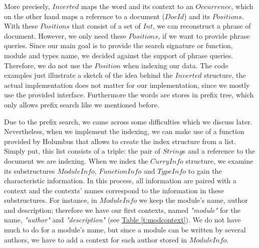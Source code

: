 \documentclass[%
	pdftex,%
	a4paper,%
	oneside,%
	chapterprefix,%
	headsepline,%
	12pt%
]{scrbook}
\newcommand{\textss}[1]{"#1"}
\newcommand{\Conid}[1]{\mathit{#1}}
\begin{document}
More precisely, \ensuremath{\Conid{Inverted}} maps the word and its context to an
\ensuremath{\Conid{Occurrence}}, which on the other hand maps a reference to a document
(\ensuremath{\Conid{DocId}}) and its \ensuremath{\Conid{Positions}}. %
With these \ensuremath{\Conid{Positions}} that consist of a set of \ensuremath{\Conid{Int}}, we can
reconstruct a phrase of document. %
However, we only need these \ensuremath{\Conid{Positions}}, if we want to provide phrase
queries. %
Since our main goal is to provide the search signature or function,
module and types name, we decided against the support of phrase
queries. %
Therefore, we do not use the \ensuremath{\Conid{Position}} when indexing our data. %
The code examples just illustrate a sketch of the idea behind the
\ensuremath{\Conid{Inverted}} structure, the actual implementation does not matter for
our implementation, since we mostly use the provided interface. %
Furthermore the words are stores in prefix tree, which only allows
prefix search like we mentioned before. %


Due to the prefix search, we came across some difficulties which we
discuss later. %
Nevertheless, when we implement the indexing, we can make use of a function
provided by Holumbus that allows to create the index structure from a
list. %
Simply put, this list consists of a triple: the pair of \ensuremath{\Conid{String}}s and
a reference to the document we are indexing. %
When we index the \ensuremath{\Conid{CurryInfo}} structure, we examine its substructures
\ensuremath{\Conid{ModuleInfo}}, \ensuremath{\Conid{FunctionInfo}} and \ensuremath{\Conid{TypeInfo}} to gain the characteristic
information. %
In this process, all information are paired with a context and the
contexts' names correspond to the information in these
substructures. %
For instance, in \ensuremath{\Conid{ModuleInfo}} we keep the module's name, author and
description; therefore we have our first contexts, named
\emph{\textss{module}} for the name, \emph{\textss{author}} and
\emph{\textss{description}} (see \hyperref[t:modcontext]{Table
  \ref{t:modcontext}}). %
We do not have much to do for a module's name, but since a module can
be written by several authors, we have to add a context for each
author stored in \ensuremath{\Conid{ModuleInfo}}. %
\end{document}
